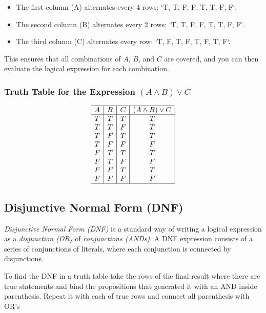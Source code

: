 \begin{itemize}
	\item The first column (A) alternates every 4 rows: `T, T, F, F, T, T, F, F`.
	\item The second column (B) alternates every 2 rows: `T, T, F, F, T, T, F, F`.
	\item The third column (C) alternates every row: `T, F, T, F, T, F, T, F`.
\end{itemize}

This ensures that all combinations of \(A\), \(B\), and \(C\) are covered, and you can then evaluate the logical expression for each combination.

\subsubsection{Truth Table for the Expression \texorpdfstring{\( (A \land B) \lor C \)}{}}

\[
	\begin{array}{|c|c|c|c|}
		\hline
		A & B & C & (A \land B) \lor C \\
		\hline
		T & T & T & T                  \\
		T & T & F & T                  \\
		T & F & T & T                  \\
		T & F & F & F                  \\
		F & T & T & T                  \\
		F & T & F & F                  \\
		F & F & T & T                  \\
		F & F & F & F                  \\
		\hline
	\end{array}
\]

\subsection{Disjunctive Normal Form (DNF)}

\emph{Disjunctive Normal Form (DNF)} is a standard way of writing a logical expression as a \emph{disjunction
(OR)} of \emph{conjunctions (ANDs)}. A DNF expression consists of a series of
conjunctions of literals, where each conjunction is connected by disjunctions.
\vspace{\baselineskip}

To find the DNF in a truth table take the rows of the final result where there are
true statements and bind the propositions that generated it with an AND inside parenthesis.
Repeat it with each of true rows and connect all parenthesis with OR's
\vspace{\baselineskip}

